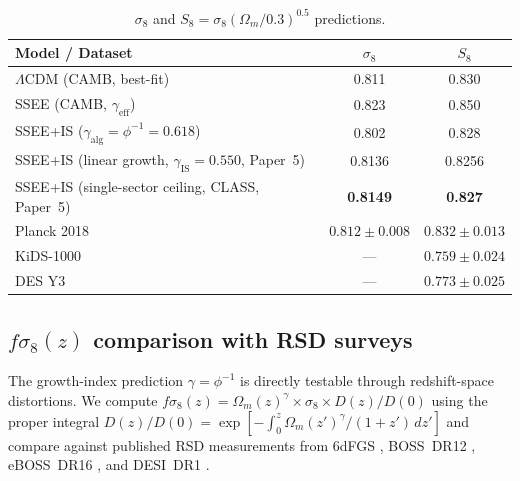 \documentclass[12pt,a4paper]{article}
\begin{document}
\begin{table}[ht]
\centering
\caption{$\sigma_8$ and $S_8=\sigma_8(\Omega_m/0.3)^{0.5}$ predictions.}
\label{tab:sigma8}
\begin{tabular}{lcc}
\hline
Model / Dataset & $\sigma_8$ & $S_8$ \\
\hline
$\Lambda$CDM (CAMB, best-fit) & 0.811 & 0.830 \\
SSEE (CAMB, $\gamma_\mathrm{eff}$) & 0.823 & 0.850 \\
SSEE+IS ($\gamma_\mathrm{alg}=\phi^{-1}=0.618$) & 0.802 & 0.828 \\
SSEE+IS (linear growth, $\gamma_\mathrm{IS}=0.550$, Paper~5) & 0.8136 & 0.8256 \\
SSEE+IS (single-sector ceiling, CLASS, Paper~5) & \textbf{0.8149} & \textbf{0.827} \\
\hline
Planck 2018 \citep{Planck2020} & $0.812\pm0.008$ & $0.832\pm0.013$ \\
KiDS-1000 \citep{Asgari2021} & --- & $0.759\pm0.024$ \\
DES Y3 \citep{DES2022} & --- & $0.773\pm0.025$ \\
\hline
\end{tabular}
\end{table}

\subsection{\texorpdfstring{$f\sigma_8(z)$}{fsig8} comparison with RSD surveys}
\label{sec:fsig8}

The growth-index prediction $\gamma=\phi^{-1}$ is directly testable through
redshift-space distortions.  We compute $f\sigma_8(z) = \Omega_m(z)^\gamma \times
\sigma_8 \times D(z)/D(0)$ using the proper integral
$D(z)/D(0) = \exp\!\left[-\int_0^z \Omega_m(z')^\gamma/(1+z')\,dz'\right]$
and compare against published RSD measurements from
6dFGS \citep{Beutler2012}, BOSS~DR12 \citep{Alam2017},
eBOSS~DR16 \citep{Alam2021,deMattia2021}, and DESI~DR1 \citep{DESI2024FS}.
\end{document}
